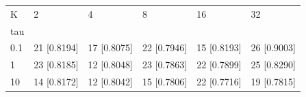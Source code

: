 \begin{tabular}{llllll}
\toprule
K & 2 & 4 & 8 & 16 & 32 \\
tau &  &  &  &  &  \\
\midrule
0.1 & 21 [0.8194] & 17 [0.8075] & 22 [0.7946] & 15 [0.8193] & 26 [0.9003] \\
1 & 23 [0.8185] & 12 [0.8048] & 23 [0.7863] & 22 [0.7899] & 25 [0.8290] \\
10 & 14 [0.8172] & 12 [0.8042] & 15 [0.7806] & 22 [0.7716] & 19 [0.7815] \\
\bottomrule
\end{tabular}
